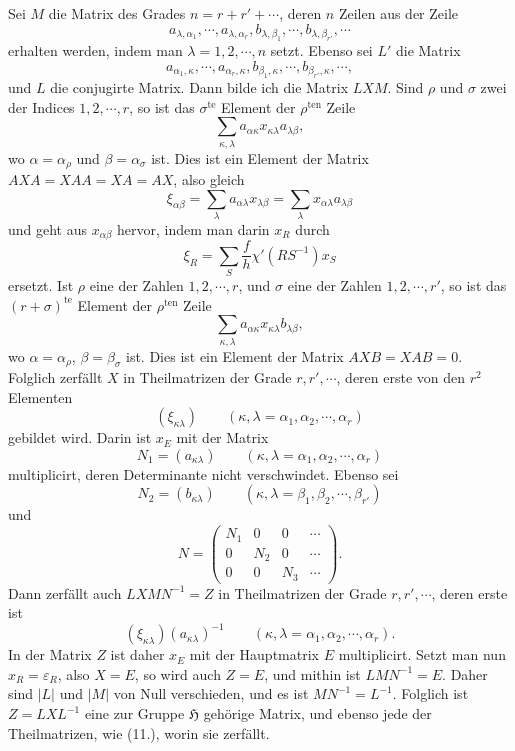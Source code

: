 \documentclass[11pt]{article}
\newcommand{\Hgr}{\mathfrak{H}}
\newcommand{\eps}{\varepsilon}
\newcommand{\ten}{\mathrm{ten}}
\newcommand{\te}{\mathrm{te}}
\begin{document}
Sei $M$ die Matrix des Grades $n=r+r'+\cdots$, deren $n$ Zeilen aus der Zeile
\[
a_{\lambda,\alpha_1},\cdots,a_{\lambda,\alpha_r},
 b_{\lambda,\beta_1},\cdots,b_{\lambda,\beta_{r'}},\cdots
\]
erhalten werden, indem man $\lambda=1,2,\cdots,n$ setzt. Ebenso sei $L'$ die Matrix
\[
a_{\alpha_1,\kappa},\cdots,a_{\alpha_r,\kappa},
 b_{\beta_1,\kappa},\cdots,b_{\beta_{r'},\kappa},\cdots,
\]
und $L$ die conjugirte Matrix. Dann bilde ich die Matrix $LXM$. Sind $\rho$ und $\sigma$ zwei der Indices $1,2,\cdots,r$, so ist das $\sigma^{\te}$ Element der $\rho^{\ten}$ Zeile
\[
\sum_{\kappa,\lambda}a_{\alpha\kappa}x_{\kappa\lambda}a_{\lambda\beta},
\]
wo $\alpha=\alpha_\rho$ und $\beta=\alpha_\sigma$ ist. Dies ist ein Element der Matrix $AXA=XAA=XA=AX$, also gleich
\begin{equation}\tag{9.}
\xi_{\alpha\beta}=\sum_\lambda a_{\alpha\lambda}x_{\lambda\beta}
=\sum_\lambda x_{\alpha\lambda}a_{\lambda\beta}
\end{equation}
und geht aus $x_{\alpha\beta}$ hervor, indem man darin $x_R$ durch
\begin{equation}\tag{10.}
\xi_R=\sum_S \frac{f}{h}\chi'(RS^{-1})x_S
\end{equation}
ersetzt. Ist $\rho$ eine der Zahlen $1,2,\cdots,r$, und $\sigma$ eine der Zahlen $1,2,\cdots,r'$, so ist das $(r+\sigma)^{\te}$ Element der $\rho^{\ten}$ Zeile
\[
\sum_{\kappa,\lambda}a_{\alpha\kappa}x_{\kappa\lambda}b_{\lambda\beta},
\]
wo $\alpha=\alpha_\rho$, $\beta=\beta_\sigma$ ist. Dies ist ein Element der Matrix $AXB=XAB=0$. Folglich zerfällt $X$ in Theilmatrizen der Grade $r,r',\cdots$, deren erste von den $r^2$ Elementen
\[
(\xi_{\kappa\lambda})\qquad(\kappa,\lambda=\alpha_1,\alpha_2,\cdots,\alpha_r)
\]
gebildet wird. Darin ist $x_E$ mit der Matrix
\[
N_1=(a_{\kappa\lambda})\qquad(\kappa,\lambda=\alpha_1,\alpha_2,\cdots,
\alpha_r)
\]
multiplicirt, deren Determinante nicht verschwindet. Ebenso sei
\[
N_2=(b_{\kappa\lambda})\qquad(\kappa,\lambda=\beta_1,\beta_2,\cdots,
\beta_{r'})
\]
und
\[
N=\begin{pmatrix}
N_1&0&0&\cdots\\
0&N_2&0&\cdots\\
0&0&N_3&\cdots
\end{pmatrix}.
\]
Dann zerfällt auch $LXMN^{-1}=Z$ in Theilmatrizen der Grade $r,r',\cdots$, deren erste ist
\begin{equation}\tag{11.}
(\xi_{\kappa\lambda})(a_{\kappa\lambda})^{-1}
\qquad(\kappa,\lambda=\alpha_1,\alpha_2,\cdots,\alpha_r).
\end{equation}
In der Matrix $Z$ ist daher $x_E$ mit der Hauptmatrix $E$ multiplicirt. Setzt man nun $x_R=\eps_R$, also $X=E$, so wird auch $Z=E$, und mithin ist $LMN^{-1}=E$. Daher sind $|L|$ und $|M|$ von Null verschieden, und es ist $MN^{-1}=L^{-1}$. Folglich ist $Z=LXL^{-1}$ eine zur Gruppe $\Hgr$ gehörige Matrix, und ebenso jede der Theilmatrizen, wie (11.), worin sie zerfällt.
\end{document}
